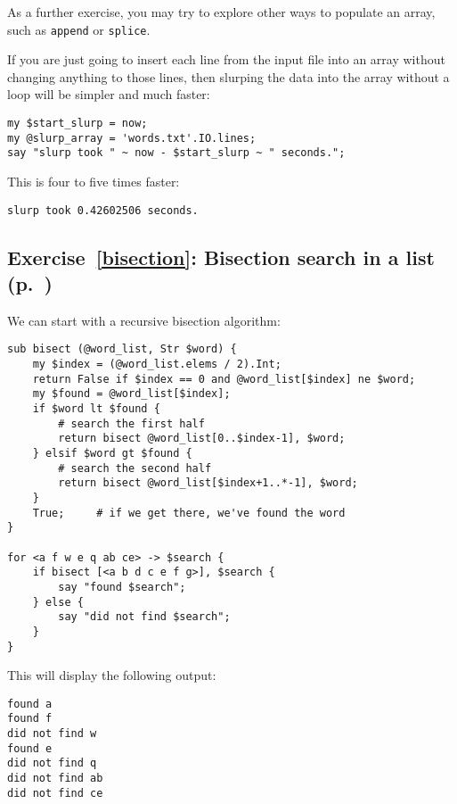 As a further exercise, you may try to explore other 
ways to populate an array, such as {\tt append} or 
{\tt splice}.

If you are just going to insert each line from the 
input file into an array without changing anything to 
those lines, then slurping the data into the array 
without a loop will be simpler and much faster:

\begin{verbatim}
my $start_slurp = now;
my @slurp_array = 'words.txt'.IO.lines;
say "slurp took " ~ now - $start_slurp ~ " seconds.";
\end{verbatim}

This is four to five times faster:
\begin{verbatim}
slurp took 0.42602506 seconds.
\end{verbatim}

\subsection{Exercise~\ref{bisection}: Bisection search in a list (p.~\pageref{bisection})}
\label{sol_bisection}

We can start with a recursive bisection algorithm:


\begin{verbatim}
sub bisect (@word_list, Str $word) {
    my $index = (@word_list.elems / 2).Int;
    return False if $index == 0 and @word_list[$index] ne $word;
    my $found = @word_list[$index];
    if $word lt $found {
        # search the first half
        return bisect @word_list[0..$index-1], $word;
    } elsif $word gt $found {
        # search the second half
        return bisect @word_list[$index+1..*-1], $word;
    }
    True;     # if we get there, we've found the word
}

for <a f w e q ab ce> -> $search { 
    if bisect [<a b d c e f g>], $search {
        say "found $search";
    } else {
        say "did not find $search";
    }
}
\end{verbatim}

This will display the following output:
\begin{verbatim}
found a
found f
did not find w
found e
did not find q
did not find ab
did not find ce
\end{verbatim}

